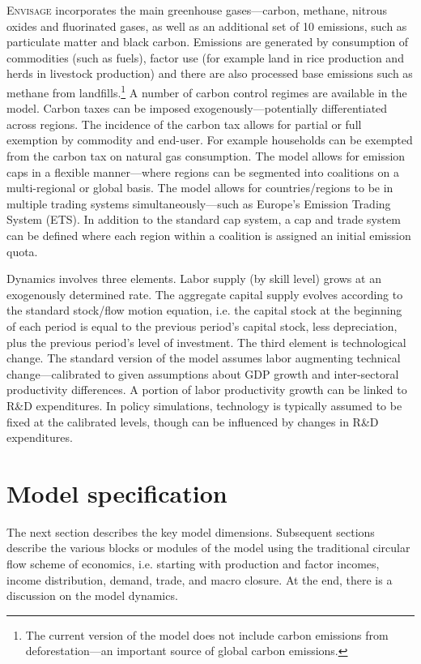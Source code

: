 \documentclass[11pt,letterpaper]{report}
\begin{document}
\textsc{Envisage} incorporates the main greenhouse gases---carbon, methane,
nitrous oxides and fluorinated gases, as well as an additional set of
10 emissions, such as particulate matter and black carbon.
Emissions are generated by consumption of
commodities (such as fuels), factor use (for example land in rice production and
herds in livestock production) and there are also processed base emissions such
as methane from landfills.\footnote{The current version of the model does not
include carbon emissions from deforestation---an important source of global
carbon emissions.} A number of carbon control regimes are available in the
model. Carbon taxes can be imposed exogenously---potentially differentiated
across regions. The incidence of the carbon tax allows for partial or full
exemption by commodity and end-user. For example households can be exempted from
the carbon tax on natural gas consumption. The model allows for emission caps in
a flexible manner---where regions can be segmented into coalitions on a
multi-regional or global basis. The model allows for
countries/regions to be in multiple trading systems simultaneously---such
as Europe's Emission Trading System (ETS). In addition to the standard cap system, a cap
and trade system can be defined where each region within a coalition is assigned
an initial emission quota.

Dynamics involves three elements. Labor supply (by skill level) grows at an
exogenously determined rate. The aggregate capital supply evolves according to
the standard stock/flow motion equation, i.e. the capital stock at the beginning
of each period is equal to the previous period's capital stock, less
depreciation, plus the previous period's level of investment. The third element
is technological change. The standard version of the model assumes labor
augmenting technical change---calibrated to given assumptions about GDP growth
and inter-sectoral productivity differences. A portion of labor productivity
growth can be linked to R\&D expenditures. In policy simulations, technology
is typically assumed to be fixed at the calibrated levels, though can be
influenced by changes in R\&D expenditures.

\chapter{Model specification}

The next section describes the key model dimensions. Subsequent sections
describe the various blocks or modules of the model using the traditional
circular flow scheme of economics, i.e. starting with production and factor
incomes, income distribution, demand, trade, and macro closure. At the end,
there is a discussion on the model dynamics.
\end{document}
